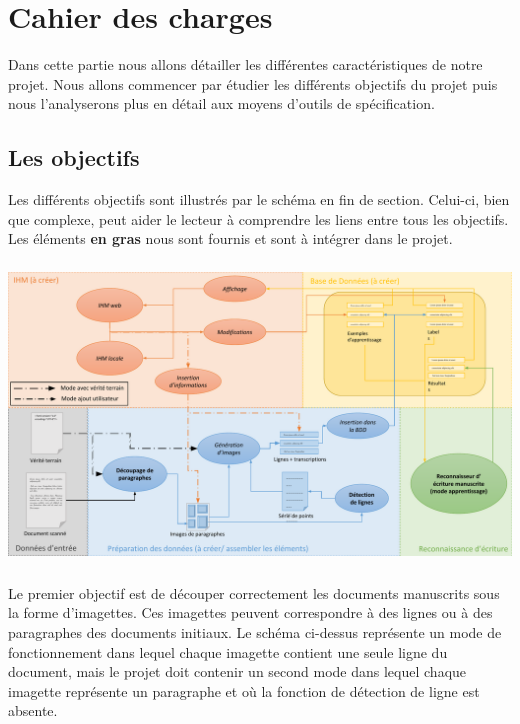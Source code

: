 \chapter{Cahier des charges}

Dans cette partie nous allons détailler les différentes caractéristiques
de notre projet. Nous allons commencer par étudier les différents objectifs
du projet puis nous l’analyserons plus en détail aux moyens d’outils de spécification.

\section{Les objectifs}

Les différents objectifs sont illustrés par le schéma en fin de section. Celui-ci,
bien que complexe, peut aider le lecteur à comprendre les liens entre tous les objectifs.
Les éléments \textbf{en gras} nous sont fournis et sont à intégrer dans le projet.

\paragraph{}
\begin{mdframed}[frametitle={Schéma représentant les différents objectifs du projet}, innerbottommargin=10]
\begin{center}
\includegraphics[width=\linewidth]{schema.pdf}
\end{center}
\end{mdframed}

\paragraph{}
Le premier objectif est de découper correctement les documents manuscrits sous la forme
d’imagettes. Ces imagettes peuvent correspondre à des lignes ou à des paragraphes des documents initiaux.
Le schéma ci-dessus représente un mode de fonctionnement dans lequel chaque imagette contient
une seule ligne du document, mais le projet doit contenir un second mode dans lequel chaque imagette
représente un paragraphe et où la fonction de détection de ligne est absente.


